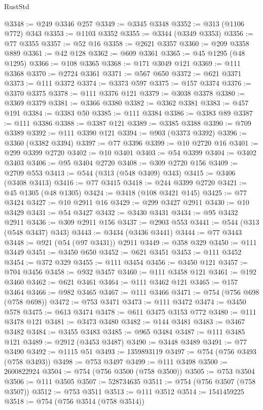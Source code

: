\begin{lexlean}{RustStd}
\begin{coremodule}
@3348 := @249 @3346 @257
@3349 := @3345 @3348
@3352 := @313 (@1106 @772) @343
@3353 := @1103 @3352
@3355 := @3344 (@3349 @3353)
@3356 := @77 @3355
@3357 := @52 @16
@3358 := @2621 @3357
@3360 := @209 @3358 @889
@3361 := @42 @128
@3362 := @609 @3361
@3365 := @45 @1295 (@48 @1295)
@3366 := @108 @3365
@3368 := @171 @3049 @121
@3369 := @111 @3368
@3370 := @2724 @3361
@3371 := @567 @650
@3372 := @621 @3371
@3373 := @111 @3372
@3374 := @3373 @597
@3375 := @157 @3374
@3376 := @3370 @3375
@3378 := @111 @3376 @121
@3379 := @3038 @3378
@3380 := @3369 @3379
@3381 := @3366 @3380
@3382 := @3362 @3381
@3383 := @457 @191
@3384 := @3383 @50
@3385 := @111 @3384
@3386 := @3383 @89
@3387 := @111 @3386
@3388 := @3387 @121
@3389 := @3385 @3388
@3390 := @709 @3389
@3392 := @111 @3390 @121
@3394 := @903 (@3373 @3392)
@3396 := @3360 (@3382 @3394)
@3397 := @77 @3396
@3399 := @10 @2720 @16
@3401 := @299 @3399 @2720
@3402 := @10 @3401
@3403 := @54 @3399
@3404 := @3402 @3403
@3406 := @95 @3404 @2720
@3408 := @309 @2720 @156
@3409 := @2709 @553
@3413 := @544 (@313 (@548 @3409) @343)
@3415 := @3406 (@3408 @3413)
@3416 := @77 @3415
@3418 := @244 @3399 @2720
@3421 := @45 @1305 (@48 @1305)
@3424 := @3418 (@108 @3421 @145)
@3425 := @77 @3424
@3427 := @10 @2911 @16
@3429 := @299 @3427 @2911
@3430 := @10 @3429
@3431 := @54 @3427
@3432 := @3430 @3431
@3434 := @95 @3432 @2911
@3436 := @309 @2911 @156
@3437 := @2903 @553
@3441 := @544 (@313 (@548 @3437) @343)
@3443 := @3434 (@3436 @3441)
@3444 := @77 @3443
@3448 := @921 (@54 (@97 @3431)) @2911
@3449 := @358 @329
@3450 := @111 @3449
@3451 := @3450 @650
@3452 := @621 @3451
@3453 := @111 @3452
@3454 := @372 @329
@3455 := @111 @3454
@3456 := @3450 @121
@3457 := @704 @3456
@3458 := @932 @3457
@3460 := @111 @3458 @121
@3461 := @192 @3460
@3462 := @621 @3461
@3464 := @111 @3462 @121
@3465 := @157 @3464
@3466 := @982 @3465
@3467 := @111 @3466
@3471 := @754 (@756 @698 (@758 @698))
@3472 := @753 @3471
@3473 := @111 @3472
@3474 := @3450 @578
@3475 := @613 @3474
@3478 := @611 @3475 @3153 @772
@3480 := @111 @3478 @121
@3481 := @3473 @3480
@3482 := @144 @3481
@3483 := @3467 @3482
@3484 := @3455 @3483
@3485 := @965 @3484
@3487 := @111 @3485 @121
@3489 := @2912 (@3453 @3487)
@3490 := @3448 @3489
@3491 := @77 @3490
@3492 := @1115 @51
@3493 := 1359893119
@3497 := @754 (@756 @3493 (@758 @3493))
@3498 := @753 @3497
@3499 := @111 @3498
@3500 := 2600822924
@3504 := @754 (@756 @3500 (@758 @3500))
@3505 := @753 @3504
@3506 := @111 @3505
@3507 := 528734635
@3511 := @754 (@756 @3507 (@758 @3507))
@3512 := @753 @3511
@3513 := @111 @3512
@3514 := 1541459225
@3518 := @754 (@756 @3514 (@758 @3514))

\end{coremodule}
\end{lexlean}

